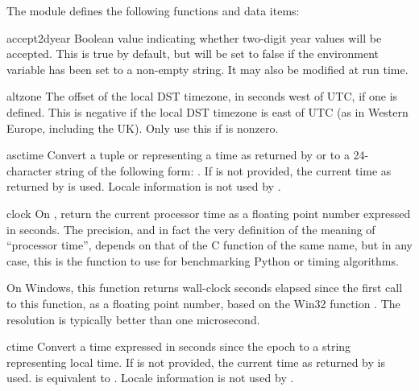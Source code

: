 The module defines the following functions and data items:


\begin{datadesc}{accept2dyear}
Boolean value indicating whether two-digit year values will be
accepted.  This is true by default, but will be set to false if the
environment variable  has been set to a non-empty
string.  It may also be modified at run time.
\end{datadesc}

\begin{datadesc}{altzone}
The offset of the local DST timezone, in seconds west of UTC, if one
is defined.  This is negative if the local DST timezone is east of UTC
(as in Western Europe, including the UK).  Only use this if
 is nonzero.
\end{datadesc}

\begin{funcdesc}{asctime}{}
Convert a tuple or  representing a time as returned
by 
or  to a 24-character string of the following form:
.  If  is not provided, the
current time as returned by  is used.
Locale information is not used by .
\end{funcdesc}

\begin{funcdesc}{clock}{}
On \UNIX, return
the current processor time as a floating point number expressed in
seconds.  The precision, and in fact the very definition of the meaning
of ``processor time'', depends
on that of the C function of the same name, but in any case, this is
the function to use for benchmarking Python or
timing algorithms.

On Windows, this function returns wall-clock seconds elapsed since the
first call to this function, as a floating point number,
based on the Win32 function .
The resolution is typically better than one microsecond.
\end{funcdesc}

\begin{funcdesc}{ctime}{}
Convert a time expressed in seconds since the epoch to a string
representing local time. If  is not provided, the current time
as returned by  is used.  
is equivalent to .
Locale information is not used by .
\end{funcdesc}

